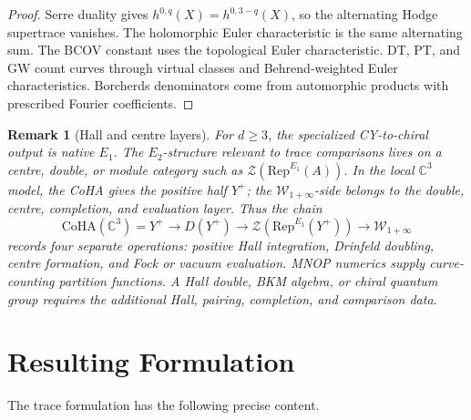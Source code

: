 \documentclass[11pt]{article}
\newtheorem{remark}[theorem]{Remark}
\providecommand{\CC}{\mathbb{C}}
\providecommand{\cZ}{\mathcal{Z}}
\providecommand{\CoHA}{\mathrm{CoHA}}
\providecommand{\Rep}{\mathrm{Rep}}
\providecommand{\Eone}{E_1}
\providecommand{\Etwo}{E_2}
\begin{document}
\begin{proof}
Serre duality gives \(h^{0,q}(X)=h^{0,3-q}(X)\), so the alternating
Hodge supertrace vanishes.  The holomorphic Euler characteristic is
the same alternating sum.  The BCOV constant uses the topological
Euler characteristic.  DT, PT, and GW count curves through virtual
classes and Behrend-weighted Euler characteristics.  Borcherds
denominators come from automorphic products with prescribed Fourier
coefficients.
\end{proof}

\begin{remark}[Hall and centre layers]
For \(d\geq 3\), the specialized CY-to-chiral output is native
\(\Eone\).  The \(\Etwo\)-structure relevant to trace comparisons lives
on a centre, double, or module category such as
\(\cZ(\Rep^{\Eone}(A))\).  In the local \(\CC^3\) model, the CoHA gives
the positive half \(Y^+\); the \(\mathcal W_{1+\infty}\)-side belongs
to the double, centre, completion, and evaluation layer.  Thus the
chain
\[
  \CoHA(\CC^3)=Y^+
  \longrightarrow D(Y^+)
  \longrightarrow \cZ(\Rep^{\Eone}(Y^+))
  \longrightarrow \mathcal W_{1+\infty}
\]
records four separate operations: positive Hall integration,
Drinfeld doubling, centre formation, and Fock or vacuum evaluation.
MNOP numerics supply curve-counting partition functions. A Hall double,
BKM algebra, or chiral quantum group requires the additional Hall,
pairing, completion, and comparison data.
\end{remark}

\section{Resulting Formulation}

The trace formulation has the following precise content.
\end{document}
